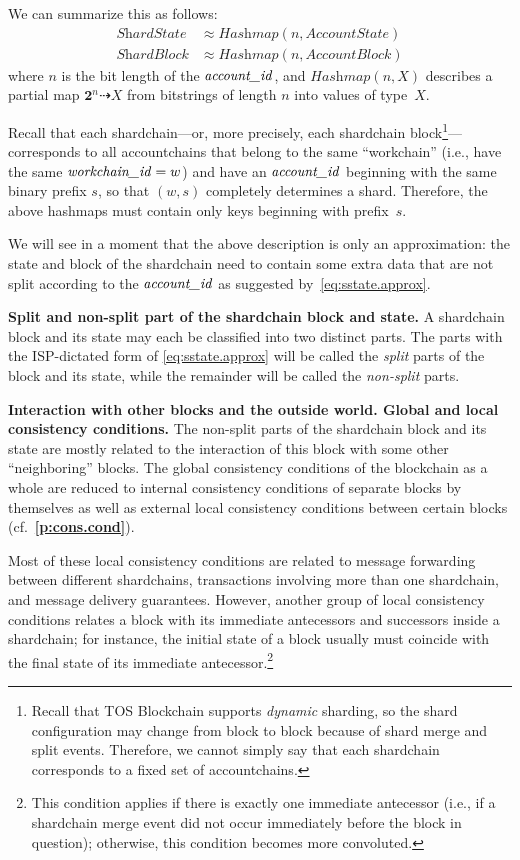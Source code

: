 \documentclass[12pt,oneside]{article}
\def\makepoint#1{\medbreak\noindent{\bf #1.\ }}
\def\nxsubpoint{\refstepcounter{subsubsection}%
  \smallbreak\makepoint{\thesubsubsection}}
\def\refpoint#1{{\rm\textbf{\ref{#1}}}}
\let\ptref=\refpoint
\def\emb#1{\textbf{#1.}}
\let\tp=\textit
\let\vr=\textit
\def\workchainid{\vr{workchain\_id\/}}
\def\accountid{\vr{account\_id\/}}
\def\Hashmap{\tp{Hashmap}}
\def\st#1{{\mathbf{#1}}}
\begin{document}
We can summarize this as follows:
\begin{align}\label{eq:sstate.approx}
  \textit{ShardState}&\approx\Hashmap(n,\textit{AccountState})\\
  \textit{ShardBlock}&\approx\Hashmap(n,\textit{AccountBlock})
\end{align}
where $n$ is the bit length of the $\accountid$, and $\Hashmap(n,X)$ describes a partial map $\st2^n\dashrightarrow X$ from bitstrings of length $n$ into values of type~$X$.

Recall that each shardchain---or, more precisely, each shardchain block\footnote{Recall that TOS Blockchain supports {\em dynamic\/} sharding, so the shard configuration may change from block to block because of shard merge and split events. Therefore, we cannot simply say that each shardchain corresponds to a fixed set of accountchains.}---corresponds to all accountchains that belong to the same ``workchain'' (i.e., have the same $\workchainid=w$) and have an $\accountid$ beginning with the same binary prefix $s$, so that $(w,s)$ completely determines a shard. Therefore, the above hashmaps must contain only keys beginning with prefix~$s$.

We will see in a moment that the above description is only an approximation: the state and block of the shardchain need to contain some extra data that are not split according to the $\accountid$ as suggested by~\eqref{eq:sstate.approx}.

\nxsubpoint\label{sp:split.blk.part}\emb{Split and non-split part of the shardchain block and state}
A shardchain block and its state may each be classified into two distinct parts. The parts with the ISP-dictated form of \eqref{eq:sstate.approx} will be called the {\em split\/} parts of the block and its state, while the remainder will be called the {\em non-split\/} parts.

\nxsubpoint\label{sp:blk.inter.1}\emb{Interaction with other blocks and the outside world. Global and local consistency conditions}
The non-split parts of the shardchain block and its state are mostly related to the interaction of this block with some other ``neighboring'' blocks. The global consistency conditions of the blockchain as a whole are reduced to internal consistency conditions of separate blocks by themselves as well as external local consistency conditions between certain blocks (cf.~\ptref{p:cons.cond}).

Most of these local consistency conditions are related to message forwarding between different shardchains, transactions involving more than one shardchain, and message delivery guarantees. However, another group of local consistency conditions relates a block with its immediate antecessors and successors inside a shardchain; for instance, the initial state of a block usually must coincide with the final state of its immediate antecessor.\footnote{This condition applies if there is exactly one immediate antecessor (i.e., if a shardchain merge event did not occur immediately before the block in question); otherwise, this condition becomes more convoluted.}
\end{document}
